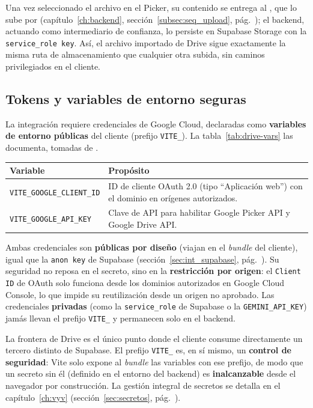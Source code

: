 Una vez seleccionado el archivo en el Picker, su contenido se entrega al
, que lo sube por 
(capítulo~\ref{ch:backend}, sección~\ref{subsec:seq_upload},
pág.~\pageref{subsec:seq_upload}); el backend, actuando como intermediario de confianza,
lo persiste en Supabase Storage con la \texttt{service\_role key}. Así, el archivo importado
de Drive sigue exactamente la misma ruta de almacenamiento que cualquier otra subida, sin
caminos privilegiados en el cliente.

\subsection{Tokens y variables de entorno seguras}
\label{subsec:drive_tokens}

La integración requiere credenciales de Google Cloud, declaradas como \textbf{variables de
entorno públicas} del cliente (prefijo \texttt{VITE\_}). La tabla~\ref{tab:drive-vars}
las documenta, tomadas de .

\vspace{0.2cm}
\noindent
\renewcommand{\arraystretch}{1.3}
\fontsize{8.5}{10.2}\selectfont\sffamily
\begin{tabularx}{\textwidth}{|L{4.4cm}|Y|}
\hline
{}
\sffamily\textbf{Variable} & \sffamily\textbf{Propósito} \\
\hline
\texttt{VITE\_GOOGLE\_CLIENT\_ID} & ID de cliente OAuth 2.0 (tipo ``Aplicación web'') con el dominio en orígenes autorizados. \\ \hline
{}
\texttt{VITE\_GOOGLE\_API\_KEY} & Clave de API para habilitar Google Picker API y Google Drive API. \\ \hline
\end{tabularx}
\label{tab:drive-vars}

\begin{AlertaSeguridad}
Ambas credenciales son \textbf{públicas por diseño} (viajan en el \textit{bundle} del
cliente), igual que la \texttt{anon key} de Supabase
(sección~\ref{sec:int_supabase}, pág.~\pageref{sec:int_supabase}). Su seguridad no reposa
en el secreto, sino en la \textbf{restricción por origen}: el \texttt{Client ID} de OAuth
solo funciona desde los dominios autorizados en Google Cloud Console, lo que impide su
reutilización desde un origen no aprobado. Las credenciales \textbf{privadas} (como la
\texttt{service\_role} de Supabase o la \texttt{GEMINI\_API\_KEY}) jamás llevan el prefijo
\texttt{VITE\_} y permanecen solo en el backend.
\end{AlertaSeguridad}

\begin{NotaTecnica}
La frontera de Drive es el único punto donde el cliente consume directamente un tercero
distinto de Supabase. El prefijo \texttt{VITE\_} es, en sí mismo, un \textbf{control de
seguridad}: Vite solo expone al \textit{bundle} las variables con ese prefijo, de modo que
un secreto sin él (definido en el entorno del backend) es \textbf{inalcanzable} desde el
navegador por construcción. La gestión integral de secretos se detalla en el
capítulo~\ref{ch:vyv} (sección~\ref{sec:secretos}, pág.~\pageref{sec:secretos}).
\end{NotaTecnica}
